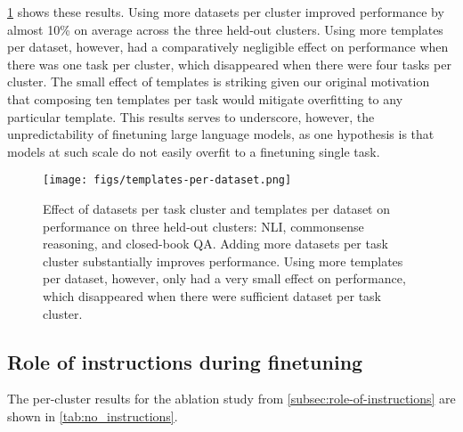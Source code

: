 \cref{fig:ablation-templates} shows these results.
Using more datasets per cluster improved performance by almost 10\% on average across the three held-out clusters. 
Using more templates per dataset, however, had a comparatively negligible effect on performance when there was one task per cluster, which disappeared when there were four tasks per cluster.
The small effect of templates is striking given our original motivation that composing ten templates per task would mitigate overfitting to any particular template. 
This results serves to underscore, however, the unpredictability of finetuning large language models, as one hypothesis is that models at such scale do not easily overfit to a finetuning single task.

\begin{figure}[h]
    \centering
    \texttt{[image: figs/templates-per-dataset.png]}
    \vspace{-2mm}
    \caption{Effect of datasets per task cluster and templates per dataset on performance on three held-out clusters: NLI, commonsense reasoning, and closed-book QA.
    Adding more datasets per task cluster substantially improves performance.
    Using more templates per dataset, however, only had a very small effect on performance, which disappeared when there were sufficient dataset per task cluster.
    }
    \label{fig:ablation-templates}
\end{figure}

\subsection{Role of instructions during finetuning}\label{subsec:role_instructions}
The per-cluster results for the ablation study from \cref{subsec:role-of-instructions} are shown in \cref{tab:no_instructions}.

